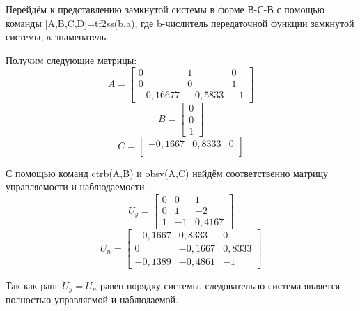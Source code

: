 \documentclass[a4paper,12pt]{article} %
\begin{document}
Перейдём к представлению замкнутой системы в форме В-С-В с помощью команды [A,B,C,D]=tf2ss(b,a), где b-числитель передаточной функции замкнутой системы, a-знаменатель.\par
Получим следующие матрицы:
\begin{equation*}
A =\begin{bmatrix}
    0       &   1   &   0 \\
    0       &   0   &	1 \\
    -0,16677    & -0,5833  &   -1
\end{bmatrix}
\end{equation*}
\begin{equation*}
B =\begin{bmatrix}
    0  \\
	0  \\
	1
\end{bmatrix}
\end{equation*}
\begin{equation*}
C =\begin{bmatrix}
    -0,1667 & 0,8333  & 0 \\
\end{bmatrix}
\end{equation*}

С помощью команд ctrb(A,B) и obsv(A,C) найдём соответственно матрицу управляемости и наблюдаемости.
\begin{equation*}
U_y =\begin{bmatrix}
    0   &   0   &   1 \\
    0   &   1   &	-2 \\
    1   &   -1  &   0,4167
\end{bmatrix}
\end{equation*}
\begin{equation*}
U_n =\begin{bmatrix}
    -0,1667 & 0,8333 & 0 \\
    0  & -0,1667 & 0,8333 \\
    -0,1389 & -0,4861 & -1
\end{bmatrix}
\end{equation*}\par
Так как ранг $U_y=U_n$ равен порядку системы, следовательно система является полностью управляемой и наблюдаемой.
\end{document}
